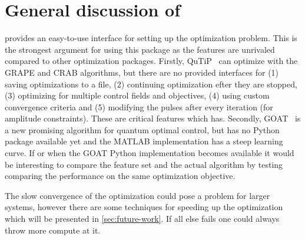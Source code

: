 \documentclass[main.tex]{subfiles}
\begin{document}
\section{General discussion of \krotov{}}
\label{sec:general}
\krotov{} provides an easy-to-use interface for setting up the optimization problem.
This is the strongest argument for using this package as the features are unrivaled compared to other optimization packages.
Firstly, QuTiP~\cite{johansson_qutip_2013} can optimize with the GRAPE and CRAB algorithms, but there are no provided interfaces for
(1) saving optimizations to a file,
(2) continuing optimization efter they are stopped,
(3) optimizing for multiple control fields and objectives,
(4) using custom convergence criteria and 
(5) modifying the pulses after every iteration (for amplitude constraints).
These are critical features which \krotov{} has.
Secondly, GOAT~\cite{machnes_gradient_2015} is a new promising algorithm for quantum optimal control, but has no Python package available yet and the MATLAB implementation has a steep learning curve.
If or when the GOAT Python implementation becomes available it would be interesting to compare the feature set and the actual algorithm by testing comparing the performance on the same optimization objective.

The slow convergence of the optimization could pose a problem for larger systems, however there are some techniques for speeding up the optimization which will be presented in \cref{sec:future-work}.
If all else fails one could always throw more compute at it.
\end{document}
